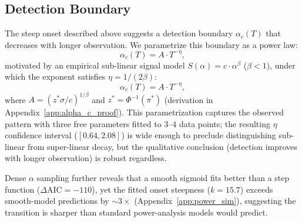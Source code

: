 \subsection{Detection Boundary}
\label{sec:theory}

The steep onset described above suggests a detection boundary $\alpha_c(T)$ that decreases with longer observation.
We parametrize this boundary as a power law:
\begin{equation}
\alpha_c(T) = A \cdot T^{-\eta},
\label{eq:alpha-c}
\end{equation}
motivated by an empirical sub-linear signal model $S(\alpha) = c \cdot \alpha^\beta$ ($\beta < 1$), under which the exponent satisfies $\eta = 1/(2\beta)$:
\begin{equation}
\alpha_c(T) = A \cdot T^{-\eta},
\label{eq:alpha-c-theory}
\end{equation}
where $A = (z^* \sigma / c)^{1/\beta}$ and $z^* = \Phi^{-1}(\pi^*)$ (derivation in Appendix~\ref{app:alpha_c_proof}).
This parametrization captures the observed pattern with three free parameters fitted to 3--4 data points; the resulting $\eta$ confidence interval ($[0.64, 2.08]$) is wide enough to preclude distinguishing sub-linear from super-linear decay, but the qualitative conclusion (detection improves with longer observation) is robust regardless.

Dense $\alpha$ sampling further reveals that a smooth sigmoid fits better than a step function ($\Delta\mathrm{AIC}{=}-110$), yet the fitted onset steepness ($k{=}15.7$) exceeds smooth-model predictions by ${\sim}3{\times}$ (Appendix~\ref{app:power_sim}), suggesting the transition is sharper than standard power-analysis models would predict.
